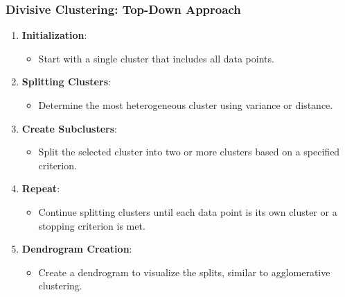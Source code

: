 \documentclass[aspectratio=169]{beamer}
\begin{document}
\begin{frame}[fragile]
    \frametitle{Divisive Clustering: Top-Down Approach}
    \begin{enumerate}
        \item \textbf{Initialization}:
        \begin{itemize}
            \item Start with a single cluster that includes all data points.
        \end{itemize}

        \item \textbf{Splitting Clusters}:
        \begin{itemize}
            \item Determine the most heterogeneous cluster using variance or distance.
        \end{itemize}

        \item \textbf{Create Subclusters}:
        \begin{itemize}
            \item Split the selected cluster into two or more clusters based on a specified criterion.
        \end{itemize}

        \item \textbf{Repeat}:
        \begin{itemize}
            \item Continue splitting clusters until each data point is its own cluster or a stopping criterion is met.
        \end{itemize}

        \item \textbf{Dendrogram Creation}:
        \begin{itemize}
            \item Create a dendrogram to visualize the splits, similar to agglomerative clustering.
        \end{itemize}
    \end{enumerate}
\end{frame}
\end{document}

